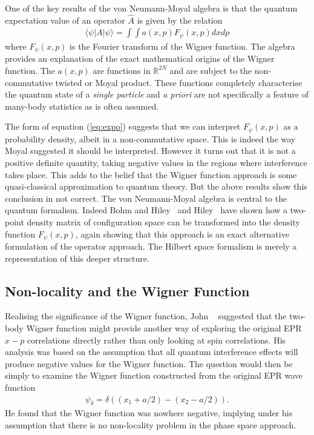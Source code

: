 \documentclass[12pt]{article}
\begin{document}
One of the key results of the von Neumann-Moyal algebra is that the quantum expectation value of an operator $\hat A$ is given by the relation
\begin{eqnarray}
\langle\psi|A|\psi\rangle=\int \int a(x,p)F_\psi(x,p)dxdp	\label{eq:expo}
\end{eqnarray}
where $F_\psi(x,p)$ is the Fourier transform of the Wigner function.  The algebra provides an explanation of the exact mathematical origins of the Wigner function.   The $a(x,p)$ are functions in $\mathbb R^{2N}$ and are subject to the non-commutative twisted or Moyal product.  These functions completely characterise the quantum state of a {\em single particle} and {\em a priori} are not specifically a feature of many-body statistics as is often assumed.

The form of equation (\ref{eq:expo}) suggests that we can interpret $F_\psi(x,p)$ as a probability density, albeit in a non-commutative space. This is indeed the way Moyal suggested it should be interpreted.  However it turns out that it is not a positive definite quantity, taking negative values in the regions where interference takes place.  This adds to the belief that the Wigner function approach is some quasi-classical approximation to quantum theory.  But the above results show this conclusion in not correct.  The von Neumann-Moyal algebra is central to the quantum formalism.  Indeed Bohm and Hiley~\cite{dbbh81} and Hiley~\cite{bh11}
have shown  how a two-point density matrix of configuration space  can be transformed into the density function $F_\psi(x,p)$, again showing that this  approach is an exact alternative formulation of the operator approach.  The Hilbert space formalism is merely a representation of this deeper structure.





\subsection{Non-locality and the Wigner Function}

Realising the significance of the Wigner function, John ~\cite{jb86}  suggested that the two-body Wigner function might provide another way of exploring the original EPR  $x-p$ correlations directly rather than only looking at spin correlations.
His analysis was based on the assumption that all quantum interference effects will produce negative values for the Wigner function.  The question would then be simply to examine the Wigner function constructed from the original  EPR wave function
\begin{eqnarray*}
\psi_\delta=\delta\left((x_1+a/2)-(x_2-a/2)\right).
\end{eqnarray*}
He found that the Wigner function was nowhere negative, implying under his assumption that there is no non-locality problem in the phase space approach. 
\end{document}
